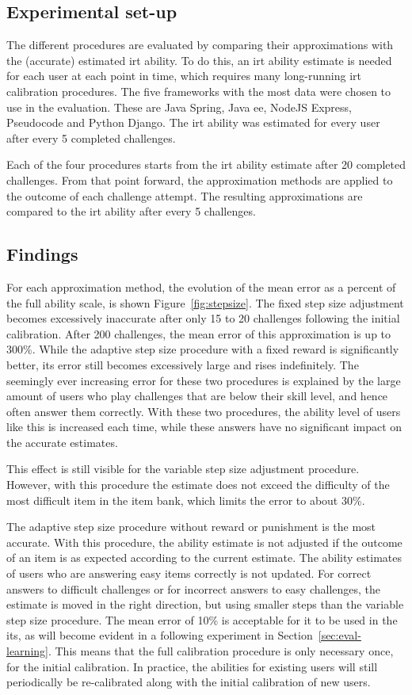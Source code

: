 \subsection{Experimental set-up}
The different procedures are evaluated by comparing their approximations with the (accurate) estimated \gls{irt} ability.
To do this, an \gls{irt} ability estimate is needed for each user at each point in time, which requires many long-running \gls{irt} calibration procedures.
The five frameworks with the most data were chosen to use in the evaluation.
These are Java Spring, Java \gls{ee}, NodeJS Express, Pseudocode and Python Django.
The \gls{irt} ability was estimated for every user after every 5 completed challenges.

Each of the four procedures starts from the \gls{irt} ability estimate after 20 completed challenges.
From that point forward, the approximation methods are applied to the outcome of each challenge attempt.
The resulting approximations are compared to the \gls{irt} ability after every 5 challenges.

\subsection{Findings}
For each approximation method, the evolution of the mean error as a percent of the full ability scale, is shown Figure~\ref{fig:stepsize}.
The fixed step size adjustment becomes excessively inaccurate after only 15 to 20 challenges following the initial calibration.
After 200 challenges, the mean error of this approximation is up to 300\%.
While the adaptive step size procedure with a fixed reward is significantly better, its error still becomes excessively large and rises indefinitely.
The seemingly ever increasing error for these two procedures is explained by the large amount of users who play challenges that are below their skill level, and hence often answer them correctly.
With these two procedures, the ability level of users like this is increased each time, while these answers have no significant impact on the accurate estimates.

This effect is still visible for the variable step size adjustment procedure.
However, with this procedure the estimate does not exceed the difficulty of the most difficult item in the item bank, which limits the error to about 30\%.

The adaptive step size procedure without reward or punishment is the most accurate.
With this procedure, the ability estimate is not adjusted if the outcome of an item is as expected according to the current estimate.
The ability estimates of users who are answering easy items correctly is not updated.
For correct answers to difficult challenges or for incorrect answers to easy challenges, the estimate is moved in the right direction, but using smaller steps than the variable step size procedure.
The mean error of 10\% is acceptable for it to be used in the \gls{its}, as will become evident in a following experiment in Section~\ref{sec:eval-learning}.
This means that the full calibration procedure is only necessary once, for the initial calibration.
In practice, the abilities for existing users will still periodically be re-calibrated along with the initial calibration of new users.

